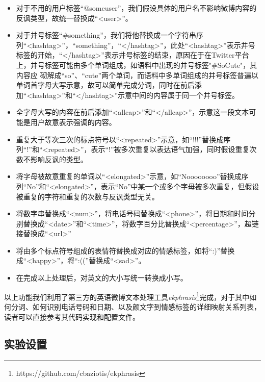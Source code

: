 \begin{itemize}

\item 对于不用的用户标签“@someuser”，我们假设具体的用户名不影响微博内容的反讽类型，故统一替换成“<user>”。

\item 对于井号标签“\#something”，我们将他替换成一个字符串序列“<hashtag>”，“something”，“</hashtag>”，此处“<hashtag>”表示井号标签的开始，“</hashtag>”表示井号标签的结束，原因在于在Twitter平台上，井号标签可能由多个单词组成，如语料中出现的井号标签"\#SoCute"，其内容应
砌解成“so”、“cute”两个单词，而语料中多单词组成的井号标签普遍以单词首字母大写示意，故可以简单完成分词，同时在前后添加“<hashtag>”和“</hashtag>”示意中间的内容属于同一个井号标签。

\item 全字母大写的内容在前后添加“<allcap>”和“</allcap>”，示意这一段文本可能是用户故意表示强调的内容。

\item 重复大于等次三次的标点符号以“<repeated>”示意，如“!!!”替换成序列“!”和“<repeated>”，表示“!”被多次重复以表达语气加强，同时假设重复次数不影响反讽的类型。

\item 将字母被故意重复的单词以“<elongated>”示意，如“Noooooooo”替换成序列“No”和“<elongated>”，表示“No”中某一个或多个字母被多次重复，但假设被重复的字符和重复的次数与反讽类型无关。

\item 将数字串替换成“<num>”，将电话号码替换成“<phone>”，将日期和时间分别替换成“<date>”和“<time>”，将数字百分比替换成“<percentage>”，超链接替换成“<url>”

\item 将由多个标点符号组成的表情符替换成对应的情感标签，如将“:)”替换成“<happy>”，将“:((”替换成“<sad>”。

\item 在完成以上处理后，对英文的大小写统一转换成小写。

\end{itemize}

以上功能我们利用了第三方的英语微博文本处理工具\textit{ekphrasis}\footnote{https://github.com/cbaziotis/ekphrasis}完成，对于其中如何分词、如何识别电话号码和日期、以及颜文字到情感标签的详细映射关系列表，读者可以直接参考其代码实现和配置文件。

\subsection{实验设置}

